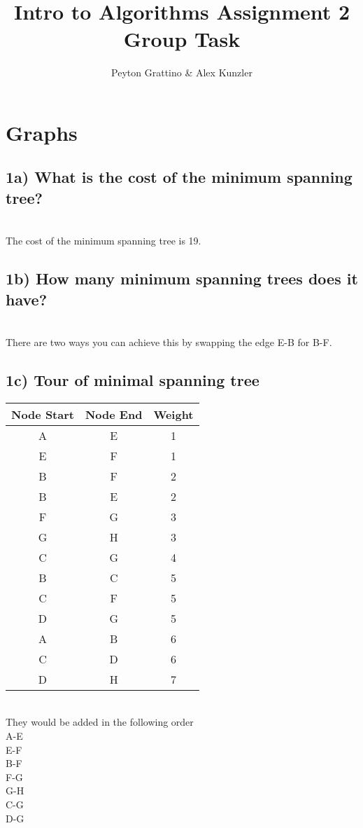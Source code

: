 \documentclass[12pt]{amsart}
\title{Intro to Algorithms Assignment 2 Group Task}
\author{Peyton Grattino \& Alex Kunzler}
\date{} %
\begin{document}
\maketitle
\tableofcontents
{}

\pagebreak
\setcounter{secnumdepth}{1}
\section{Graphs}
\subsection*{1a) \quad What is the cost of the minimum spanning tree?}
\leavevmode
\\ The cost of the minimum spanning tree is 19.

\subsection*{1b) \quad How many minimum spanning trees does it have?}
\leavevmode
\\ There are two ways you can achieve this by swapping the edge E-B for B-F.

\subsection*{1c) \quad Tour of minimal spanning tree}
\begin{center}
\begin{tabular}{ | c | c | c |}
\hline
Node Start & Node End & Weight \\
\hline
\hline
A & E & 1 \\
\hline
E & F & 1 \\
\hline
B & F & 2 \\
\hline
B & E & 2 \\
\hline
F & G & 3 \\
\hline
G & H & 3 \\
\hline
C & G & 4 \\
\hline
B & C & 5 \\
\hline
C & F & 5 \\
\hline
D & G & 5 \\
\hline
A & B & 6 \\
\hline
C & D & 6 \\
\hline
D & H & 7 \\
\hline
\end{tabular}
\leavevmode
\linebreak
\\ They would be added in the following order
\leavevmode
\\
A-E \\ E-F \\ B-F \\ F-G \\ G-H \\ C-G \\ D-G
\end{center}
\pagebreak
\end{document}
